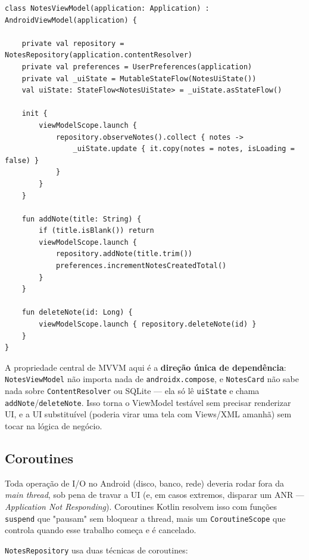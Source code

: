 \documentclass[11pt,a4paper]{article}
\begin{document}
\begin{lstlisting}[caption={NotesViewModel: estado + eventos, sem nenhuma referência a Compose}, label=lst:viewmodel]
class NotesViewModel(application: Application) : AndroidViewModel(application) {

    private val repository = NotesRepository(application.contentResolver)
    private val preferences = UserPreferences(application)
    private val _uiState = MutableStateFlow(NotesUiState())
    val uiState: StateFlow<NotesUiState> = _uiState.asStateFlow()

    init {
        viewModelScope.launch {
            repository.observeNotes().collect { notes ->
                _uiState.update { it.copy(notes = notes, isLoading = false) }
            }
        }
    }

    fun addNote(title: String) {
        if (title.isBlank()) return
        viewModelScope.launch {
            repository.addNote(title.trim())
            preferences.incrementNotesCreatedTotal()
        }
    }

    fun deleteNote(id: Long) {
        viewModelScope.launch { repository.deleteNote(id) }
    }
}
\end{lstlisting}

A propriedade central de MVVM aqui é a \textbf{direção única de
dependência}: \texttt{NotesViewModel} não importa nada de
\texttt{androidx.compose}, e \texttt{NotesCard} não sabe nada sobre
\texttt{ContentResolver} ou SQLite — ela só lê \texttt{uiState} e chama
\texttt{addNote}/\texttt{deleteNote}. Isso torna o ViewModel testável
sem precisar renderizar UI, e a UI substituível (poderia virar uma tela
com Views/XML amanhã) sem tocar na lógica de negócio.

\subsection{Coroutines}
\label{sec:coroutines}

Toda operação de I/O no Android (disco, banco, rede) deveria rodar fora
da \emph{main thread}, sob pena de travar a UI (e, em casos extremos,
disparar um ANR — \emph{Application Not Responding}). Coroutines
Kotlin resolvem isso com funções \texttt{suspend} que "pausam" sem
bloquear a thread, mais um \texttt{CoroutineScope} que controla quando
esse trabalho começa e é cancelado.

\texttt{NotesRepository} usa duas técnicas de coroutines:
\end{document}
